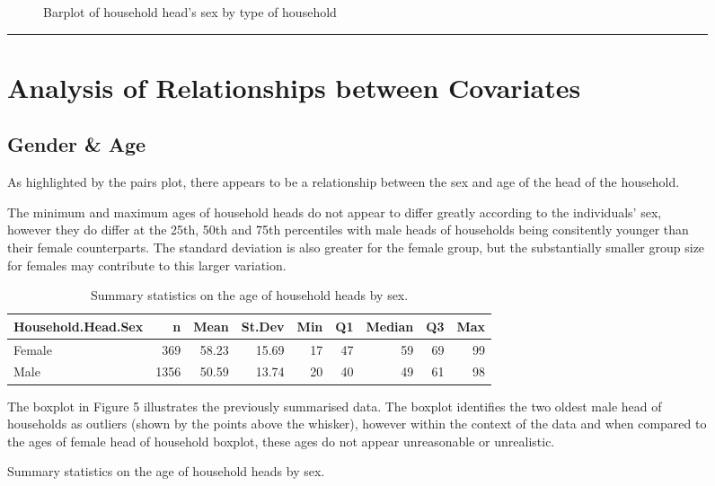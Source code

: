 \documentclass[
]{article}
\begin{document}
\begin{figure}[H]
\begin{figure}[H]
{}

\caption{Barplot of household head's sex by type of household}\label{fig:barplot of sex by type of household}
\end{figure}

\begin{center}\rule{0.5\linewidth}{0.5pt}\end{center}

\newpage

\hypertarget{sec:ARC}{%
\section{Analysis of Relationships between Covariates}\label{sec:ARC}}

\hypertarget{gender-age}{%
\subsection{Gender \& Age}\label{gender-age}}

As highlighted by the pairs plot, there appears to be a relationship
between the sex and age of the head of the household.

The minimum and maximum ages of household heads do not appear to differ
greatly according to the individuals' sex, however they do differ at the
25th, 50th and 75th percentiles with male heads of households being
consitently younger than their female counterparts. The standard
deviation is also greater for the female group, but the substantially
smaller group size for females may contribute to this larger variation.

\begin{table}[!h]

\caption{\label{tab:summaries of age by sex}Summary statistics on the age of household heads by sex.}
\centering
\begin{tabular}[t]{l|r|r|r|r|r|r|r|r}
\hline
Household.Head.Sex & n & Mean & St.Dev & Min & Q1 & Median & Q3 & Max\\
\hline
Female & 369 & 58.23 & 15.69 & 17 & 47 & 59 & 69 & 99\\
\hline
Male & 1356 & 50.59 & 13.74 & 20 & 40 & 49 & 61 & 98\\
\hline
\end{tabular}
\end{table}

The boxplot in Figure 5 illustrates the previously summarised data. The
boxplot identifies the two oldest male head of households as outliers
(shown by the points above the whisker), however within the context of
the data and when compared to the ages of female head of household
boxplot, these ages do not appear unreasonable or unrealistic.


\end{figure}
\end{document}
